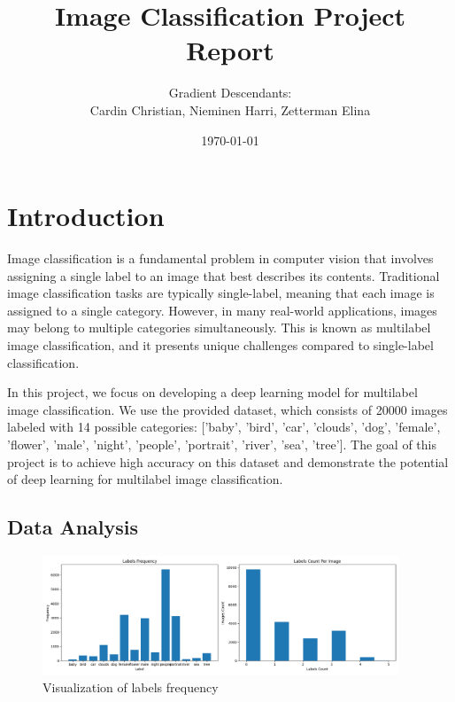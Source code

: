 \documentclass[a4paper, 12pt]{article}
\title{Image Classification Project Report}
\author{Gradient Descendants: \\Cardin Christian, Nieminen Harri, Zetterman Elina}
\date{\today}
\begin{document}
\maketitle

\section{Introduction}
Image classification is a fundamental problem in computer vision that involves assigning a single label to an image that best describes its contents. Traditional image classification tasks are typically single-label, meaning that each image is assigned to a single category. However, in many real-world applications, images may belong to multiple categories simultaneously. This is known as multilabel image classification, and it presents unique challenges compared to single-label classification.


In this project, we focus on developing a deep learning model for multilabel image classification. We use the provided dataset, which consists of 20000 images labeled with 14 possible categories: ['baby', 'bird', 'car', 'clouds', 'dog', 'female', 'flower', 'male', 'night', 'people', 'portrait', 'river', 'sea', 'tree']. The goal of this project is to achieve high accuracy on this dataset and demonstrate the potential of deep learning for multilabel image classification.

\subsection{Data Analysis}
\begin{figure}[h]
    \centering	
      \includegraphics[width=0.95\textwidth]{"img/labels.png"}
    \caption{Visualization of labels frequency}
    \label{fig:labels}
\end{figure}


\end{document}
